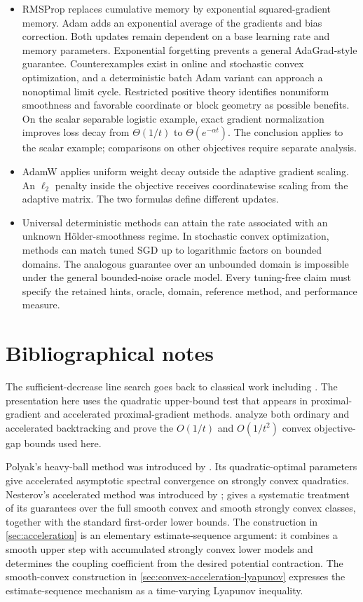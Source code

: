 \documentclass[11pt,twoside]{article}
\theoremstyle{definition}
\theoremstyle{remark}
\begin{document}
\begin{itemize}[leftmargin=*]
bound when gradient activity is concentrated in a small number of coordinates.
\item RMSProp replaces cumulative memory by exponential squared-gradient
memory. Adam adds an exponential average of the gradients and bias correction.
Both updates remain dependent on a base learning rate and memory parameters.
Exponential forgetting prevents a general AdaGrad-style guarantee.
Counterexamples exist in online and
stochastic convex optimization, and a deterministic batch Adam variant can
approach a nonoptimal limit cycle. Restricted positive theory identifies
nonuniform smoothness and favorable coordinate or block geometry as possible
benefits. On the scalar separable logistic example, exact gradient
normalization improves loss decay from $\Theta(1/t)$ to
$\Theta(e^{-\alpha t})$. The conclusion applies to the scalar example;
comparisons on other objectives require separate analysis.
\item AdamW applies uniform weight decay outside the adaptive gradient
scaling. An $\ell_2$ penalty inside the objective receives coordinatewise
scaling from the adaptive matrix. The two formulas define different updates.
\item Universal deterministic methods can attain the rate associated with an
unknown H\"older-smoothness regime. In stochastic convex optimization, methods
can match tuned SGD up to logarithmic factors on bounded domains. The analogous
guarantee over an unbounded domain is impossible under the general
bounded-noise oracle model. Every tuning-free claim must specify the retained
hints, oracle, domain, reference method, and performance measure.
\end{itemize}

\printendnotes

\section*{Bibliographical notes}

The sufficient-decrease line search goes back to classical work including
\citet{armijo1966}. The presentation here uses the quadratic upper-bound test
that appears in proximal-gradient and accelerated proximal-gradient methods.
\citet{beck2009} analyze both ordinary and accelerated backtracking and prove
the $O(1/t)$ and $O(1/t^2)$ convex objective-gap bounds used here.

Polyak's heavy-ball method was introduced by \citet{polyak1964}. Its
quadratic-optimal parameters give accelerated asymptotic spectral convergence
on strongly convex quadratics. Nesterov's accelerated method was introduced
by \citet{nesterov1983}; \citet{nesterov2004} gives a systematic treatment of
its guarantees over the full smooth convex and smooth strongly convex
classes, together with the standard first-order lower bounds. The construction
in \cref{sec:acceleration} is an elementary estimate-sequence argument: it
combines a smooth upper step with accumulated strongly convex lower models and
determines the coupling coefficient from the desired potential contraction.
The smooth-convex construction in
\cref{sec:convex-acceleration-lyapunov} expresses the estimate-sequence
mechanism as a time-varying Lyapunov inequality.
\end{document}
